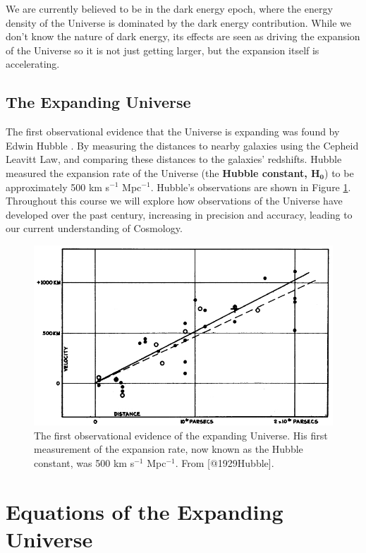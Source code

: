 \documentclass[11pt,a4paper]{book}
\begin{document}
We are currently believed to be in the dark energy epoch, where the
energy density of the Universe is dominated by the dark energy
contribution. While we don't know the nature of dark energy, its effects
are seen as driving the expansion of the Universe so it is not just
getting larger, but the expansion itself is accelerating.

\hypertarget{sec:expanding_intro}{%
\section{The Expanding Universe}\label{sec:expanding_intro}}

The first observational evidence that the Universe is expanding was
found by Edwin Hubble \citep{1929Hubble}. By measuring the distances
to nearby galaxies using the Cepheid Leavitt Law, and comparing
these distances to the galaxies' redshifts. Hubble measured the
expansion rate of the Universe (the \textbf{Hubble constant, \(\mathbf{H_0}\)})
to be approximately 500 km s\(^{-1}\) Mpc\(^{-1}\). Hubble's observations
are shown in
Figure \ref{fig:hubble-h0-diagram}. Throughout this course we will
explore how observations of the Universe have developed over the past
century, increasing in precision and accuracy, leading to our current
understanding of Cosmology.

\begin{figure}
\includegraphics[width=1\linewidth]{Images/hubble-diagram} \caption{The first observational evidence of the expanding Universe. His first measurement of the expansion rate, now known as the Hubble constant, was 500 km s$^{-1}$ Mpc$^{-1}$. From [@1929Hubble].}\label{fig:hubble-h0-diagram}
\end{figure}

\hypertarget{ch:eqs_of_expanding}{%
\chapter{Equations of the Expanding Universe}\label{ch:eqs_of_expanding}}
\end{document}
